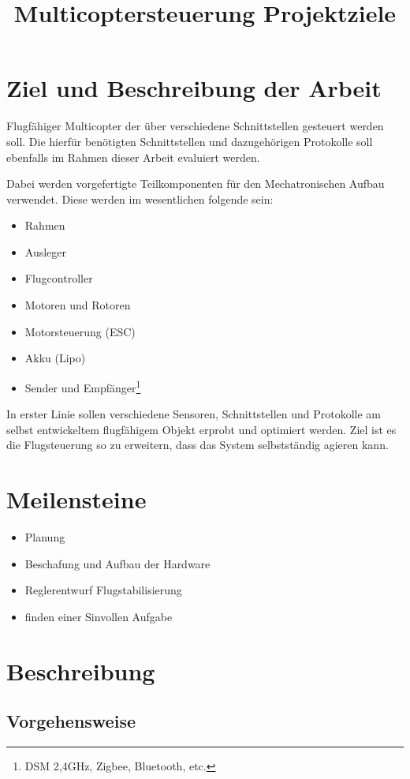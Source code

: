 \documentclass[12pt,a4paper]{article}
\title{Multicoptersteuerung Projektziele}
\begin{document}
\maketitle

\section{Ziel und Beschreibung der Arbeit}
	Flugfähiger Multicopter der über verschiedene Schnittstellen gesteuert werden soll.
	Die hierfür benötigten Schnittstellen und dazugehörigen Protokolle soll ebenfalls im Rahmen dieser Arbeit 
	evaluiert werden.
	
	Dabei werden vorgefertigte Teilkomponenten für den Mechatronischen Aufbau verwendet. Diese werden 
	im wesentlichen folgende sein:
	\begin{itemize}
		\item	Rahmen
		\item	Ausleger
		\item	Flugcontroller
		\item	Motoren und Rotoren 
		\item	Motorsteuerung (ESC)
		\item	Akku (Lipo)
		\item	Sender und Empfänger\footnote{DSM 2,4GHz, Zigbee, Bluetooth, etc.}
	\end{itemize}
	
	In erster Linie sollen verschiedene Sensoren, Schnittstellen und Protokolle am selbst entwickeltem flugfähigem Objekt erprobt und 
	optimiert werden. Ziel ist es die Flugsteuerung so zu erweitern, dass das System selbstständig agieren kann.

\section{Meilensteine}
	\begin{itemize}
		\item	Planung
		\item	Beschafung und Aufbau der Hardware
		\item	Reglerentwurf Flugstabilisierung
		\item	finden einer Sinvollen Aufgabe
	\end{itemize}
	
\section{Beschreibung}
	\subsection{Vorgehensweise}
%	
	
\end{document}
